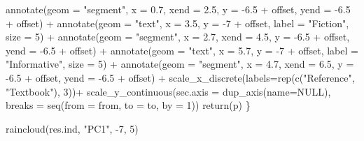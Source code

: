 \documentclass[
  letterpaper,
  DIV=11,
  numbers=noendperiod]{scrreprt}
\newenvironment{Shaded}{\begin{snugshade}}{\end{snugshade}}
\newcommand{\AttributeTok}[1]{\textcolor[rgb]{0.40,0.45,0.13}{#1}}
\newcommand{\ConstantTok}[1]{\textcolor[rgb]{0.56,0.35,0.01}{#1}}
\newcommand{\DecValTok}[1]{\textcolor[rgb]{0.68,0.00,0.00}{#1}}
\newcommand{\FloatTok}[1]{\textcolor[rgb]{0.68,0.00,0.00}{#1}}
\newcommand{\FunctionTok}[1]{\textcolor[rgb]{0.28,0.35,0.67}{#1}}
\newcommand{\NormalTok}[1]{\textcolor[rgb]{0.00,0.23,0.31}{#1}}
\newcommand{\SpecialCharTok}[1]{\textcolor[rgb]{0.37,0.37,0.37}{#1}}
\newcommand{\StringTok}[1]{\textcolor[rgb]{0.13,0.47,0.30}{#1}}
\begin{document}
\begin{Shaded}
\begin{Highlighting}[]
    \FunctionTok{annotate}\NormalTok{(}\AttributeTok{geom =} \StringTok{"segment"}\NormalTok{, }\AttributeTok{x =} \FloatTok{0.7}\NormalTok{, }\AttributeTok{xend =} \FloatTok{2.5}\NormalTok{, }\AttributeTok{y =} \SpecialCharTok{{-}}\FloatTok{6.5} \SpecialCharTok{+}\NormalTok{ offset, }\AttributeTok{yend =} \SpecialCharTok{{-}}\FloatTok{6.5} \SpecialCharTok{+}\NormalTok{ offset) }\SpecialCharTok{+}
    \FunctionTok{annotate}\NormalTok{(}\AttributeTok{geom =} \StringTok{"text"}\NormalTok{, }\AttributeTok{x =} \FloatTok{3.5}\NormalTok{, }\AttributeTok{y =} \SpecialCharTok{{-}}\DecValTok{7} \SpecialCharTok{+}\NormalTok{ offset, }\AttributeTok{label =} \StringTok{"Fiction"}\NormalTok{, }\AttributeTok{size =} \DecValTok{5}\NormalTok{) }\SpecialCharTok{+}
    \FunctionTok{annotate}\NormalTok{(}\AttributeTok{geom =} \StringTok{"segment"}\NormalTok{, }\AttributeTok{x =} \FloatTok{2.7}\NormalTok{, }\AttributeTok{xend =} \FloatTok{4.5}\NormalTok{, }\AttributeTok{y =} \SpecialCharTok{{-}}\FloatTok{6.5} \SpecialCharTok{+}\NormalTok{ offset, }\AttributeTok{yend =} \SpecialCharTok{{-}}\FloatTok{6.5} \SpecialCharTok{+}\NormalTok{ offset) }\SpecialCharTok{+}
    \FunctionTok{annotate}\NormalTok{(}\AttributeTok{geom =} \StringTok{"text"}\NormalTok{, }\AttributeTok{x =} \FloatTok{5.7}\NormalTok{, }\AttributeTok{y =} \SpecialCharTok{{-}}\DecValTok{7} \SpecialCharTok{+}\NormalTok{ offset, }\AttributeTok{label =} \StringTok{"Informative"}\NormalTok{, }\AttributeTok{size =} \DecValTok{5}\NormalTok{) }\SpecialCharTok{+}
    \FunctionTok{annotate}\NormalTok{(}\AttributeTok{geom =} \StringTok{"segment"}\NormalTok{, }\AttributeTok{x =} \FloatTok{4.7}\NormalTok{, }\AttributeTok{xend =} \FloatTok{6.5}\NormalTok{, }\AttributeTok{y =} \SpecialCharTok{{-}}\FloatTok{6.5} \SpecialCharTok{+}\NormalTok{ offset, }\AttributeTok{yend =} \SpecialCharTok{{-}}\FloatTok{6.5} \SpecialCharTok{+}\NormalTok{ offset) }\SpecialCharTok{+}
    \FunctionTok{scale\_x\_discrete}\NormalTok{(}\AttributeTok{labels=}\FunctionTok{rep}\NormalTok{(}\FunctionTok{c}\NormalTok{(}\StringTok{"Reference"}\NormalTok{, }\StringTok{"Textbook"}\NormalTok{), }\DecValTok{3}\NormalTok{))}\SpecialCharTok{+}
    \FunctionTok{scale\_y\_continuous}\NormalTok{(}\AttributeTok{sec.axis =} \FunctionTok{dup\_axis}\NormalTok{(}\AttributeTok{name=}\ConstantTok{NULL}\NormalTok{), }\AttributeTok{breaks =} \FunctionTok{seq}\NormalTok{(}\AttributeTok{from =}\NormalTok{ from, }\AttributeTok{to =}\NormalTok{ to, }\AttributeTok{by =} \DecValTok{1}\NormalTok{))}
  \FunctionTok{return}\NormalTok{(p)}
\NormalTok{\}}

\FunctionTok{raincloud}\NormalTok{(res.ind, }\StringTok{"PC1"}\NormalTok{, }\SpecialCharTok{{-}}\DecValTok{7}\NormalTok{, }\DecValTok{5}\NormalTok{)}
\end{Highlighting}
\end{Shaded}
\end{document}
